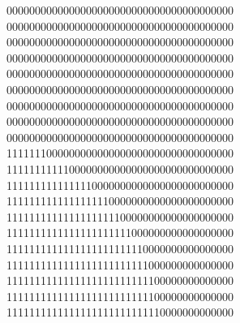 0000000000000000000000000000000000000000
0000000000000000000000000000000000000000
0000000000000000000000000000000000000000
0000000000000000000000000000000000000000
0000000000000000000000000000000000000000
0000000000000000000000000000000000000000
0000000000000000000000000000000000000000
0000000000000000000000000000000000000000
0000000000000000000000000000000000000000
1111111000000000000000000000000000000000
1111111111100000000000000000000000000000
1111111111111110000000000000000000000000
1111111111111111110000000000000000000000
1111111111111111111100000000000000000000
1111111111111111111111000000000000000000
1111111111111111111111110000000000000000
1111111111111111111111111000000000000000
1111111111111111111111111100000000000000
1111111111111111111111111100000000000000
1111111111111111111111111110000000000000
